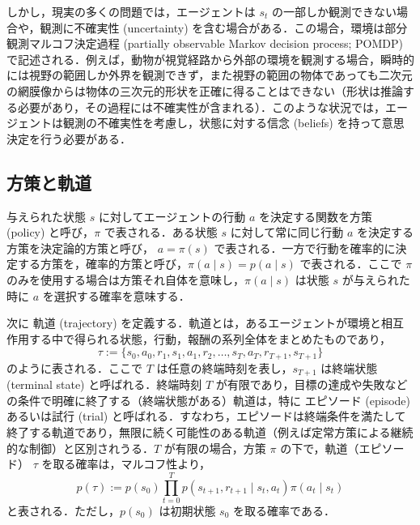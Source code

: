 \documentclass[titlepage]{ltjsbook}
\begin{document}
しかし，現実の多くの問題では，エージェントは $s_t$ の一部しか観測できない場合や，観測に不確実性 (uncertainty) を含む場合がある．この場合，環境は部分観測マルコフ決定過程 (partially observable Markov decision process; POMDP) で記述される．例えば，動物が視覚経路から外部の環境を観測する場合，瞬時的には視野の範囲しか外界を観測できず，また視野の範囲の物体であっても二次元の網膜像からは物体の三次元的形状を正確に得ることはできない（形状は推論する必要があり，その過程には不確実性が含まれる）．このような状況では，エージェントは観測の不確実性を考慮し，状態に対する信念 (beliefs) を持って意思決定を行う必要がある．

\subsection{方策と軌道}
与えられた状態 $s$ に対してエージェントの行動 $a$ を決定する関数を方策 (policy) と呼び，$\pi$ で表される．ある状態 $s$ に対して常に同じ行動 $a$ を決定する方策を決定論的方策と呼び， $a=\pi(s)$ で表される．一方で行動を確率的に決定する方策を，確率的方策と呼び，$\pi(a \mid s) = p(a \mid s)$ で表される．ここで $\pi$ のみを使用する場合は方策それ自体を意味し，$\pi(a \mid s)$ は状態 $s$ が与えられた時に $a$ を選択する確率を意味する．

次に 軌道 (trajectory) を定義する．軌道とは，あるエージェントが環境と相互作用する中で得られる状態，行動，報酬の系列全体をまとめたものであり，
\begin{equation}
\tau := \{s_0, a_0, r_1, s_1, a_1, r_2, \ldots, s_T, a_T, r_{T+1}, s_{T+1}\}
\end{equation}
のように表される．ここで $T$ は任意の終端時刻を表し，$s_{T+1}$ は終端状態 (terminal state) と呼ばれる．終端時刻 $T$ が有限であり，目標の達成や失敗などの条件で明確に終了する（終端状態がある）軌道は，特に エピソード (episode) あるいは試行 (trial) と呼ばれる．すなわち，エピソードは終端条件を満たして終了する軌道であり，無限に続く可能性のある軌道（例えば定常方策による継続的な制御）と区別されうる．$T$ が有限の場合，方策 $\pi$ の下で，軌道（エピソード） $\tau$ を取る確率は，マルコフ性より，
\begin{equation}
p(\tau) := p(s_0) \prod_{t=0}^T p(s_{t+1}, r_{t+1}\mid s_t, a_t) \pi(a_t \mid s_t)
\end{equation}
と表される．ただし，$p(s_0)$ は初期状態 $s_0$ を取る確率である．
\end{document}
